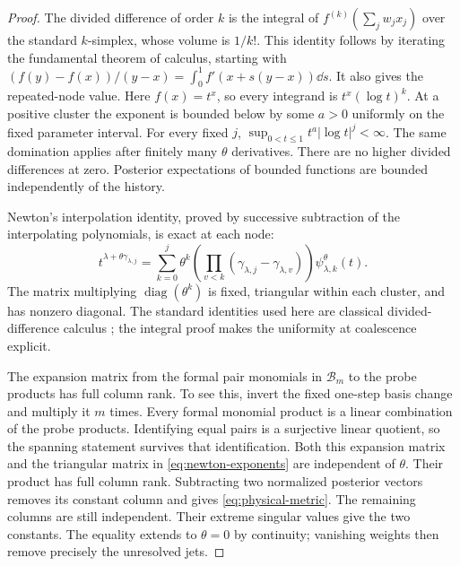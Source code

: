 \documentclass[11pt]{amsart}
\theoremstyle{definition}\newtheorem{definition}[theorem]{Definition}
\theoremstyle{remark}\newtheorem{remark}[theorem]{Remark}
\begin{document}
\begin{proof}
The divided difference of order $k$ is the integral of
$f^{(k)}(\sum_jw_jx_j)$ over the standard $k$-simplex, whose volume is
$1/k!$. This identity follows by iterating the fundamental theorem of
calculus, starting with $(f(y)-f(x))/(y-x)=\int_0^1f'(x+s(y-x))\dd s$.
It also gives the repeated-node value. Here $f(x)=t^x$, so every
integrand is $t^x(\log t)^k$. At a positive cluster the exponent is
bounded below by some $a>0$ uniformly on the fixed parameter interval.
For every fixed $j$, $\sup_{0<t\le1}t^a|\log t|^j<\infty$.
The same domination applies after finitely many $\theta$ derivatives.
There are no higher divided differences at zero. Posterior expectations
of bounded functions are bounded independently of the history.

Newton's interpolation identity, proved by successive subtraction of
the interpolating polynomials, is exact at each node:
\begin{equation}\label{eq:newton-exponents}
 t^{\lambda+\theta\gamma_{\lambda,j}}
   =\sum_{k=0}^j\theta^k
      \left(\prod_{v<k}(\gamma_{\lambda,j}-\gamma_{\lambda,v})\right)
                  \psi_{\lambda,k}^\theta(t).
\end{equation}
The matrix multiplying $\operatorname{diag}(\theta^k)$ is fixed,
triangular within each cluster, and has nonzero diagonal. The standard
identities used here are classical divided-difference calculus
\cite{deBoor}; the integral proof makes the uniformity at coalescence
explicit.

The expansion matrix from the formal pair monomials in $\mathcal B_m$
to the probe products has full column rank. To see this, invert the fixed
one-step basis change and multiply it $m$ times. Every formal monomial
product is a linear combination of the probe products. Identifying equal
pairs is a surjective linear quotient, so the spanning statement survives
that identification. Both this expansion matrix and the triangular
matrix in \eqref{eq:newton-exponents} are independent of $\theta$.
Their product has full column rank. Subtracting two normalized posterior
vectors removes its constant column and gives \eqref{eq:physical-metric}.
The remaining columns are still independent. Their extreme singular
values give the two constants. The equality extends to $\theta=0$ by
continuity; vanishing weights then remove precisely the unresolved jets.
\end{proof}
\end{document}

